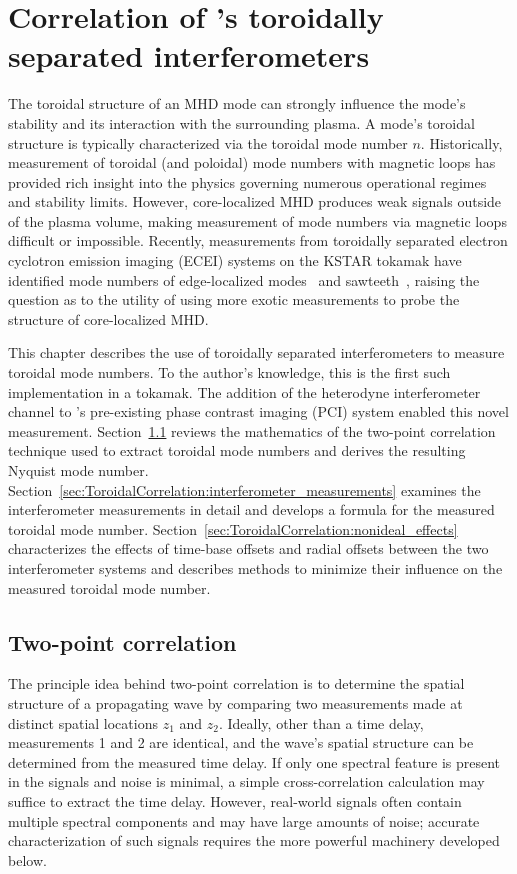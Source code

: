 \chapter{Correlation of \diiid's toroidally separated interferometers}
The toroidal structure of an MHD mode can strongly influence
the mode's stability and its interaction with the surrounding plasma.
A mode's toroidal structure is typically characterized
via the toroidal mode number $n$.
Historically, measurement of toroidal (and poloidal) mode numbers
with magnetic loops has provided rich insight
into the physics governing numerous operational regimes and stability limits.
However, core-localized MHD produces weak signals outside of the plasma volume,
making measurement of mode numbers via magnetic loops difficult or impossible.
Recently, measurements from toroidally separated
electron cyclotron emission imaging (ECEI) systems
on the KSTAR tokamak have identified mode numbers of
edge-localized modes~\cite{lee_rsi_2014} and
sawteeth~\cite{choe_nf_2015},
raising the question as to the utility of using more exotic measurements
to probe the structure of core-localized MHD.

This chapter describes the use of toroidally separated interferometers
to measure toroidal mode numbers.
To the author's knowledge, this is the first such implementation in a tokamak.
The addition of the heterodyne interferometer channel
to \diiid's pre-existing phase contrast imaging (PCI) system
enabled this novel measurement.
Section~\ref{sec:ToroidalCorrelation:two_point_correlation}
reviews the mathematics of the two-point correlation technique
used to extract toroidal mode numbers and
derives the resulting Nyquist mode number.
Section~\ref{sec:ToroidalCorrelation:interferometer_measurements}
examines the interferometer measurements in detail and
develops a formula for the measured toroidal mode number.
Section~\ref{sec:ToroidalCorrelation:nonideal_effects}
characterizes the effects of time-base offsets and radial offsets
between the two interferometer systems and
describes methods to minimize their influence
on the measured toroidal mode number.


\section{Two-point correlation}
\label{sec:ToroidalCorrelation:two_point_correlation}
The principle idea behind two-point correlation
is to determine the spatial structure of a propagating wave
by comparing two measurements made
at distinct spatial locations $z_1$ and $z_2$.
Ideally, other than a time delay, measurements 1 and 2 are identical, and
the wave's spatial structure can be determined from the measured time delay.
If only one spectral feature is present in the signals and noise is minimal,
a simple cross-correlation calculation may suffice to extract the time delay.
However, real-world signals often contain multiple spectral components and
may have large amounts of noise;
accurate characterization of such signals requires the more powerful
machinery developed below.

